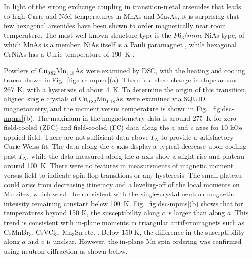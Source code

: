\documentclass[10pt,doublespacing,edeposit]{uiucthesis2020}
\newcommand*{\cumnas}{Cu$_{0.82}$Mn$_{1.18}$As}
\begin{document}
\begin{mainmatter}
In light of the strong exchange coupling in transition-metal arsenides that leads to high Curie and N\'{e}el temperatures in MnAs and Mn$_2$As, it is surprising that few hexagonal arsenides have been shown to order magnetically near room temperature. The most well-known structure type is the $P6_3/mmc$  NiAs-type, of which MnAs is a member. NiAs itself is a Pauli paramagnet \cite{nozue_specific_1997}, while hexagonal CrNiAs has a Curie temperature of 190~K \cite{stadnik_magnetization_2008}.

Powders of \cumnas\ were examined by DSC, with the heating and cooling traces shown in Fig.\ \ref{fig:dsc-mpms}(a).
There is a clear change in slope around 267~K, with a hysteresis of about 4~K.
To determine the origin of this transition, aligned single crystals of \cumnas\ were examined via SQUID magnetometry, and the moment versus temperature is shown in Fig.\ \ref{fig:dsc-mpms}(b).
The maximum in the magnetometry data is around 275~K for zero-field-cooled (ZFC) and field-cooled (FC) data along the $a$ and $c$ axes {\color{black} for 10 kOe applied field}. There are not sufficient data above $T_N$ to provide a satisfactory Curie-Weiss fit.
The data along the $c$ axis display a typical decrease upon cooling past $T_N$, while the data measured along the $a$ axis show a slight rise and plateau around 100~K.
There were no features in measurements of magnetic moment versus field to indicate spin-flop transitions or any hysteresis. The small plateau could arise from decreasing itineracy and a leveling-off of the local moments on Mn sites, which would be consistent with the single-crystal neutron magnetic intensity remaining constant below 100~K. 
{\color{black}  Fig. \ref{fig:dsc-mpms}(b) shows that for temperatures beyond 150 K, the susceptibility along $c$ is larger than along $a$. This trend is consistent with in-plane moments in triangular antiferromagnets such as CsMnBr$_3$, CsVCl$_3$, Mn$_3$Sn etc. \cite{Brown_1990,Kotyuzhanskii1991,Hirakawa1983,Duan2015}. Below 150 K, the difference in the susceptibility along $a$ and $c$ is unclear. However, the in-plane Mn spin ordering was confirmed using neutron diffraction as shown below.}



\end{mainmatter}
\end{document}
